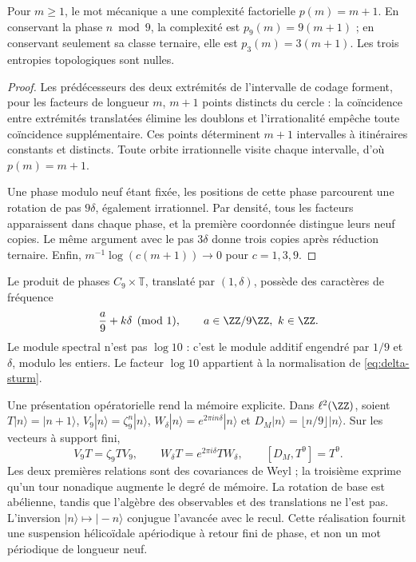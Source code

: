 \begin{theorem}
Pour \(m\ge1\), le mot mécanique a une complexité factorielle \(p(m)=m+1\). En conservant la phase \(n\bmod9\), la complexité est \(p_9(m)=9(m+1)\) ; en conservant seulement sa classe ternaire, elle est \(p_3(m)=3(m+1)\). Les trois entropies topologiques sont nulles.
\end{theorem}
\begin{proof}
Les prédécesseurs des deux extrémités de l'intervalle de codage forment, pour les facteurs de longueur \(m\), \(m+1\) points distincts du cercle : la coïncidence entre extrémités translatées élimine les doublons et l'irrationalité empêche toute coïncidence supplémentaire. Ces points déterminent \(m+1\) intervalles à itinéraires constants et distincts. Toute orbite irrationnelle visite chaque intervalle, d'où \(p(m)=m+1\).

Une phase modulo neuf étant fixée, les positions de cette phase parcourent une rotation de pas \(9\delta\), également irrationnel. Par densité, tous les facteurs apparaissent dans chaque phase, et la première coordonnée distingue leurs neuf copies. Le même argument avec le pas \(3\delta\) donne trois copies après réduction ternaire. Enfin, \(m^{-1}\log(c(m+1))\to0\) pour \(c=1,3,9\).
\end{proof}

Le produit de phases \(C_9\times\mathbb T\), translaté par \((1,\delta)\), possède des caractères de fréquence
\[
 \frac a9+k\delta\pmod1,\qquad a\in\ZZ/9\ZZ,\ k\in\ZZ.
\]
Le module spectral n'est pas \(\log10\) : c'est le module additif engendré par \(1/9\) et \(\delta\), modulo les entiers. Le facteur \(\log10\) appartient à la normalisation de \eqref{eq:delta-sturm}.

Une présentation opératorielle rend la mémoire explicite. Dans \(\ell^2(\ZZ)\), soient \(T|n\rangle=|n+1\rangle\), \(V_9|n\rangle=\zeta_9^n|n\rangle\), \(W_\delta|n\rangle=e^{2\pi i n\delta}|n\rangle\) et \(D_M|n\rangle=\lfloor n/9\rfloor|n\rangle\). Sur les vecteurs à support fini,
\begin{equation}
 V_9T=\zeta_9TV_9,\qquad
 W_\delta T=e^{2\pi i\delta}TW_\delta,\qquad
 [D_M,T^9]=T^9.
 \label{eq:weyl-relojes}
\end{equation}
Les deux premières relations sont des covariances de Weyl ; la troisième exprime qu'un tour nonadique augmente le degré de mémoire. La rotation de base est abélienne, tandis que l'algèbre des observables et des translations ne l'est pas. L'inversion \(|n\rangle\mapsto|-n\rangle\) conjugue l'avancée avec le recul. Cette réalisation fournit une suspension hélicoïdale apériodique à retour fini de phase, et non un mot périodique de longueur neuf.

